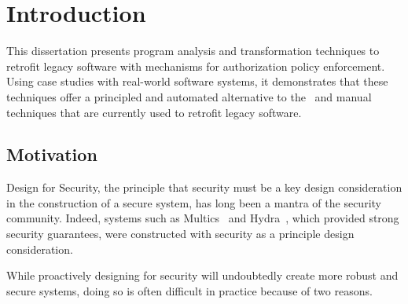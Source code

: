 \chapter{Introduction}
\label{chapter:introduction}


This dissertation presents program analysis and transformation techniques to
retrofit legacy software with mechanisms for authorization policy enforcement.
Using case studies with real-world software systems, it demonstrates that these
techniques offer a principled and automated alternative to the \adhoc\ and
manual techniques that are currently used to retrofit legacy software.


\section{Motivation}
\label{chapter:introduction:motivation}


Design for Security, the principle that security must be a key design
consideration in the construction of a secure system, has long been a mantra of
the security community. Indeed, systems such as Multics~\cite{cv65} and
Hydra~\cite{wcc+74}, which provided strong security guarantees, were
constructed with security as a principle design consideration. 

While proactively designing for security will undoubtedly create more robust
and secure systems, doing so is often difficult in practice because of two
reasons.

